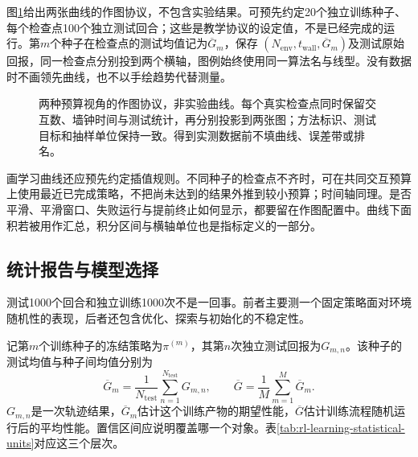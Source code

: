 图\ref{fig:rl-learning-evaluation-protocol}给出两张曲线的作图协议，不包含实验结果。可预先约定20个独立训练种子、每个检查点100个独立测试回合；这些是教学协议的设定值，不是已经完成的运行。第$m$个种子在检查点的测试均值记为$\overline G_m$，保存
$(N_{\mathrm{env}},t_{\mathrm{wall}},\overline G_m)$及测试原始回报，同一检查点分别投到两个横轴，图例始终使用同一算法名与线型。没有数据时不画领先曲线，也不以手绘趋势代替测量。

\begin{figure}[t]
  \centering
  
  \caption{两种预算视角的作图协议，非实验曲线。每个真实检查点同时保留交互数、墙钟时间与测试统计，再分别投影到两张图；方法标识、测试目标和抽样单位保持一致。得到实测数据前不填曲线、误差带或排名。}
  \label{fig:rl-learning-evaluation-protocol}
\end{figure}

画学习曲线还应预先约定插值规则。不同种子的检查点不齐时，可在共同交互预算上使用最近已完成策略，不把尚未达到的结果外推到较小预算；时间轴同理。是否平滑、平滑窗口、失败运行与提前终止如何显示，都要留在作图配置中。曲线下面积若被用作汇总，积分区间与横轴单位也是指标定义的一部分。

\subsection{统计报告与模型选择}
\label{sec:rl-learning-statistical-report}

测试1000个回合和独立训练1000次不是一回事。前者主要测一个固定策略面对环境随机性的表现，后者还包含优化、探索与初始化的不稳定性。

记第$m$个训练种子的冻结策略为$\pi^{(m)}$，其第$n$次独立测试回报为$G_{m,n}$。该种子的测试均值与种子间均值分别为
\[
 \overline G_m=\frac1{N_{\mathrm{test}}}
                    \sum_{n=1}^{N_{\mathrm{test}}}G_{m,n},\qquad
 \overline G=\frac1M\sum_{m=1}^{M}\overline G_m .
\]
$G_{m,n}$是一次轨迹结果，$\overline G_m$估计这个训练产物的期望性能，$\overline G$估计训练流程随机运行后的平均性能。置信区间应说明覆盖哪一个对象。表\ref{tab:rl-learning-statistical-units}对应这三个层次。


